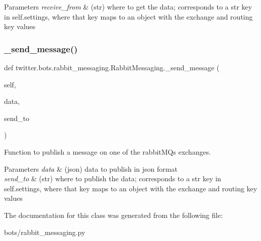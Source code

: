\begin{DoxyParams}{Parameters}
{\em receive\+\_\+from} & (str) where to get the data; corresponds to a str key in self.\+settings, where that key maps to an object with the exchange and routing key values \\
\hline
\end{DoxyParams}
\mbox{\label{classtwitter_1_1bots_1_1rabbit__messaging_1_1RabbitMessaging_a82b3f62dcb3c12e53c03678128038832}} 
\subsubsection{\texorpdfstring{\+\_\+send\+\_\+message()}{\_send\_message()}}
{\footnotesize\ttfamily def twitter.\+bots.\+rabbit\+\_\+messaging.\+Rabbit\+Messaging.\+\_\+send\+\_\+message (\begin{DoxyParamCaption}\item[{}]{self,  }\item[{}]{data,  }\item[{}]{send\+\_\+to }\end{DoxyParamCaption})\hspace{0.3cm}{\ttfamily [private]}}



Function to publish a message on one of the rabbit\+MQ\textquotesingle{}s exchanges. 


\begin{DoxyParams}{Parameters}
{\em data} & (json) data to publish in json format \\
\hline
{\em send\+\_\+to} & (str) where to publish the data; corresponds to a str key in self.\+settings, where that key maps to an object with the exchange and routing key values \\
\hline
\end{DoxyParams}


The documentation for this class was generated from the following file\+:\begin{DoxyCompactItemize}
\item 
bots/rabbit\+\_\+messaging.\+py\end{DoxyCompactItemize}
